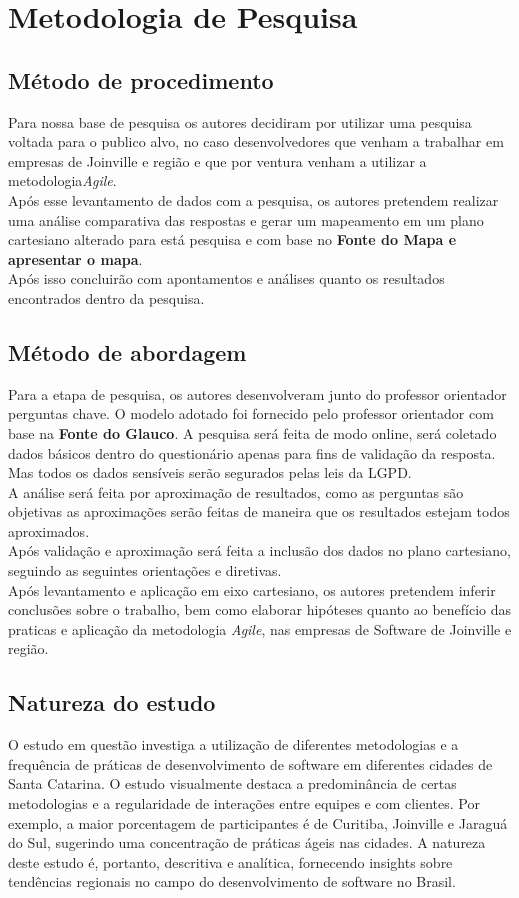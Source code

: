 \documentclass[12pt]{article}
\begin{document}
\section{Metodologia de Pesquisa}
\subsection{Método de procedimento}
Para nossa base de pesquisa os autores decidiram por utilizar uma pesquisa voltada para o publico alvo, no caso desenvolvedores que venham a trabalhar em empresas de Joinville e região e que por ventura venham a utilizar a metodologia\textit{Agile}. 
\\Após esse levantamento de dados com a pesquisa, os autores pretendem realizar uma análise comparativa das respostas e gerar um mapeamento em um plano cartesiano alterado para está pesquisa e com base no \textbf{Fonte do Mapa e apresentar o mapa}.
\\Após isso concluirão com apontamentos e análises quanto os resultados encontrados dentro da pesquisa.
\subsection{Método de abordagem}
Para a etapa de pesquisa, os autores desenvolveram junto do professor orientador perguntas chave. O modelo adotado foi fornecido pelo professor orientador com base na \textbf{Fonte do Glauco}.
A pesquisa será feita de modo online, será coletado dados básicos dentro do questionário apenas para fins de validação da resposta. Mas todos os dados sensíveis serão segurados pelas leis da LGPD.
\\A análise será feita por aproximação de resultados, como as perguntas são objetivas as aproximações serão feitas de maneira que os resultados estejam todos aproximados.
\\Após validação e aproximação será feita a inclusão dos dados no plano cartesiano, seguindo as seguintes orientações e diretivas.
\\Após levantamento e aplicação em eixo cartesiano, os autores pretendem inferir conclusões sobre o trabalho, bem como elaborar hipóteses quanto ao benefício das praticas e aplicação da metodologia \textit{Agile}, nas empresas de Software de Joinville e região.
\subsection{Natureza do estudo}
O estudo em questão investiga a utilização de diferentes metodologias e a frequência de práticas de desenvolvimento de software em diferentes cidades de Santa Catarina. O estudo visualmente destaca a predominância de certas metodologias e a regularidade de interações entre equipes e com clientes. Por exemplo, a maior porcentagem de participantes é de Curitiba, Joinville e Jaraguá do Sul, sugerindo uma concentração de práticas ágeis nas cidades. A natureza deste estudo é, portanto, descritiva e analítica, fornecendo insights sobre tendências regionais no campo do desenvolvimento de software no Brasil.
\end{document}
